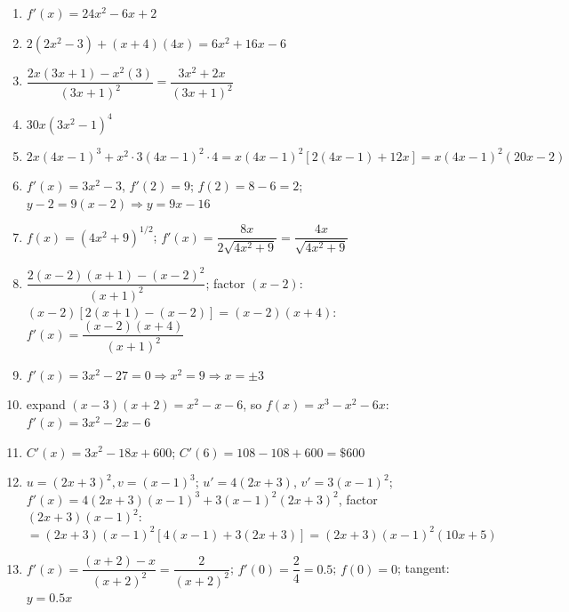 \documentclass[11pt]{article}
\begin{document}
\begin{keybox}
\begin{multicols}{2}
\small
\begin{enumerate}[leftmargin=*,itemsep=3pt]
  \item $f'(x)=24x^2-6x+2$
  \item $2(2x^2-3)+(x+4)(4x)=6x^2+16x-6$
  \item $\dfrac{2x(3x+1)-x^2(3)}{(3x+1)^2}=\dfrac{3x^2+2x}{(3x+1)^2}$
  \item $30x(3x^2-1)^4$
  \item $2x(4x-1)^3+x^2\cdot3(4x-1)^2\cdot4=x(4x-1)^2[2(4x-1)+12x]=x(4x-1)^2(20x-2)$
  \item $f'(x)=3x^2-3$, $f'(2)=9$; $f(2)=8-6=2$; $y-2=9(x-2)\Rightarrow y=9x-16$
  \item $f(x)=(4x^2+9)^{1/2}$; $f'(x)=\dfrac{8x}{2\sqrt{4x^2+9}}=\dfrac{4x}{\sqrt{4x^2+9}}$
  \item $\dfrac{2(x-2)(x+1)-(x-2)^2}{(x+1)^2}$; factor $(x-2)$: $(x-2)[2(x+1)-(x-2)]=(x-2)(x+4)$: $f'(x)=\dfrac{(x-2)(x+4)}{(x+1)^2}$
  \item $f'(x)=3x^2-27=0\Rightarrow x^2=9\Rightarrow x=\pm3$
  \item expand $(x-3)(x+2)=x^2-x-6$, so $f(x)=x^3-x^2-6x$: $f'(x)=3x^2-2x-6$
  \item $C'(x)=3x^2-18x+600$; $C'(6)=108-108+600=\$600$
  \item $u=(2x+3)^2,v=(x-1)^3$; $u'=4(2x+3)$, $v'=3(x-1)^2$; $f'(x)=4(2x+3)(x-1)^3+3(x-1)^2(2x+3)^2$, factor $(2x+3)(x-1)^2$: $=(2x+3)(x-1)^2[4(x-1)+3(2x+3)]=(2x+3)(x-1)^2(10x+5)$
  \item $f'(x)=\dfrac{(x+2)-x}{(x+2)^2}=\dfrac2{(x+2)^2}$; $f'(0)=\dfrac24=0.5$; $f(0)=0$; tangent: $y=0.5x$
\end{enumerate}
\end{multicols}
\end{keybox}
\end{document}
